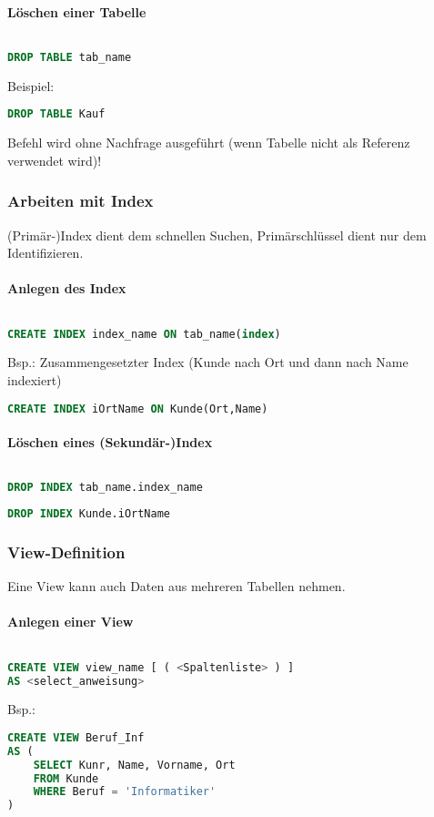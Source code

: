 \paragraph{Löschen einer Tabelle} $ $
\begin{lstlisting}[language=SQL]
DROP TABLE tab_name
\end{lstlisting}
Beispiel:
\begin{lstlisting}[language=SQL]
DROP TABLE Kauf
\end{lstlisting}
Befehl wird ohne Nachfrage ausgeführt (wenn Tabelle nicht als Referenz verwendet wird)!
\subsubsection{Arbeiten mit Index}
(Primär-)Index dient dem schnellen Suchen, Primärschlüssel dient nur dem Identifizieren.
\paragraph{Anlegen des Index} $ $
\begin{lstlisting}[language=SQL]
CREATE INDEX index_name ON tab_name(index)
\end{lstlisting}
Bsp.: Zusammengesetzter Index (Kunde nach Ort und dann nach Name indexiert)
\begin{lstlisting}[language=SQL]
CREATE INDEX iOrtName ON Kunde(Ort,Name)
\end{lstlisting}
\paragraph{Löschen eines (Sekundär-)Index} $ $
\begin{lstlisting}[language=SQL]
DROP INDEX tab_name.index_name
\end{lstlisting}
\begin{lstlisting}[language=SQL]
DROP INDEX Kunde.iOrtName
\end{lstlisting}
\subsubsection{View-Definition}
Eine View kann auch Daten aus mehreren Tabellen nehmen.
\paragraph{Anlegen einer View} $ $
\begin{lstlisting}[language=SQL]
CREATE VIEW view_name [ ( <Spaltenliste> ) ] 
AS <select_anweisung>
\end{lstlisting}
Bsp.:
\begin{lstlisting}[language=SQL]
CREATE VIEW Beruf_Inf
AS (
	SELECT Kunr, Name, Vorname, Ort
	FROM Kunde
	WHERE Beruf = 'Informatiker'
)
\end{lstlisting}
